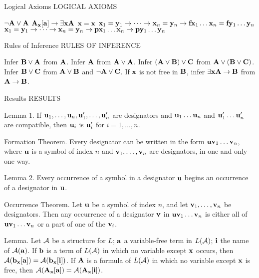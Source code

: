  {Logical Axioms}
\beginsection LOGICAL AXIOMS

{\leftskip 1in
 $\neg {\bf A} \lor {\bf A}$
 ${\bf A}_{\bf x}[{\bf a}] \to \exists {\bf x}{\bf A}$
 ${\bf x} = {\bf x}$
 ${\bf x}_1 = {\bf y}_1 \to \cdots \to {\bf x}_n = {\bf y}_n \to {\bf f}{\bf x}_1 \dots {\bf x}_n = {\bf f}{\bf y}_1 \dots {\bf y}_n$
\itemitem{} ${\bf x}_1 = {\bf y}_1 \to \cdots \to {\bf x}_n = {\bf y}_n \to {\bf p}{\bf x}_1 \dots {\bf x}_n \to {\bf p}{\bf y}_1 \dots {\bf y}_n$
\par}

 {Rules of Inference}
\beginsection RULES OF INFERENCE

{\leftskip 1in
 Infer ${\bf B} \lor {\bf A}$ from ${\bf A}$.
 Infer ${\bf A}$ from ${\bf A} \lor {\bf A}$.
 Infer $({\bf A} \lor {\bf B}) \lor {\bf C}$ from ${\bf A} \lor ({\bf B} \lor {\bf C})$.
 Infer ${\bf B} \lor {\bf C}$ from ${\bf A} \lor {\bf B}$ and $\neg{\bf A} \lor {\bf C}$.
 If ${\bf x}$ is not free in ${\bf B}$, infer $\exists {\bf x}{\bf A} \to {\bf B}$ from ${\bf A} \to {\bf B}$.
\par}

 {Results}
\beginsection RESULTS


\proclaim Lemma 1.
If ${\bf u}_1, \dots, {\bf u}_n, {\bf u}_1', \dots, {\bf u}_n'$ are designators
and ${\bf u}_1 \dots {\bf u}_n$ and ${\bf u}_1' \dots {\bf u}_n'$ are compatible,
then ${\bf u}_i$ is ${\bf u}'_i$ for $i = 1, \dots , n$.

\proclaim Formation Theorem.
Every designator can be written in the form ${\bf u}{\bf v}_1\dots{\bf v}_n$, where 
$\bf u$ is a symbol of index $n$ and ${\bf v}_1, \dots, {\bf v}_n$ are 
designators, in one and only one way.

\proclaim Lemma 2.
Every occurrence of a symbol in a designator $\bf u$ begins an occurrence of a
designator in $\bf u$.

\proclaim Occurrence Theorem.
Let $\bf u$ be a symbol of index $n$, and let ${\bf v}_1, \dots, {\bf v}_n$ be 
designators. Then any occurrence of a designator $\bf v$ in ${\bf u}{\bf v}_1 \dots {\bf v}_n$
is either all of ${\bf u}{\bf v}_1 \dots {\bf v}_n$ or a part of one of the ${\bf v}_i$.


\proclaim Lemma.
Let $\cal A$ be a structure for $L$; $\bf a$ a variable-free term in $L({\cal A})$;
$\bf i$ the name of ${\cal A}({\bf a})$. If $\bf b$ is a term of $L({\cal A})$ in
which no variable except $\bf x$ occurs, then ${\cal A}({\bf b_x}[{\bf a}]) = {\cal A}({\bf b_x}[{\bf i}])$.
If ${\bf A}$ is a formula of $L({\cal A})$ in which no variable except $\bf x$ is 
free, then ${\cal A}({\bf A_x}[{\bf a}]) = {\cal A}({\bf A_x}[{\bf i}])$.

